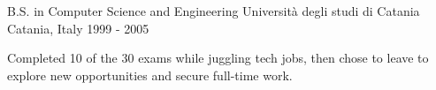 

\begin{cventries}

  \cventry
  {B.S. in Computer Science and Engineering} %
  {Università degli studi di Catania} %
  {Catania, Italy} %
  {1999 - 2005} %
  {
    \begin{cvitems} %
      Completed 10 of the 30 exams while juggling tech jobs, then chose to leave to explore new opportunities and secure full-time work.
    \end{cvitems}
  }

\end{cventries}
